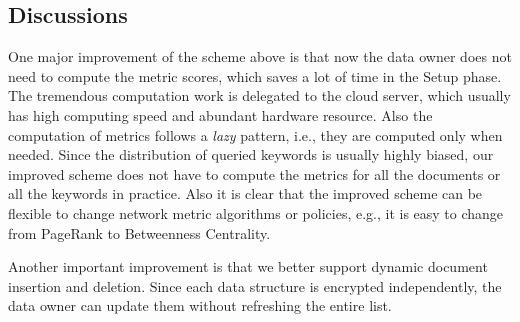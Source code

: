 \documentclass{IEEEtran}
\begin{document}
\subsection{Discussions}
One major improvement of the scheme above is that now the data owner does not need to compute the metric scores, which saves a lot of time in the Setup phase. The tremendous computation work is delegated to the cloud server, which usually has high computing speed and abundant hardware resource. Also the computation of metrics follows a \emph{lazy} pattern, i.e., they are computed only when needed. Since the distribution of queried keywords is usually highly biased, our improved scheme does not have to compute the metrics for all the documents or all the keywords in practice. Also it is clear that the improved scheme can be flexible to change network metric algorithms or policies, e.g., it is easy to change from PageRank to Betweenness Centrality.

Another important improvement is that we better support dynamic document insertion and deletion. Since each data structure is encrypted independently, the data owner can update them without refreshing the entire list.



\end{document}
